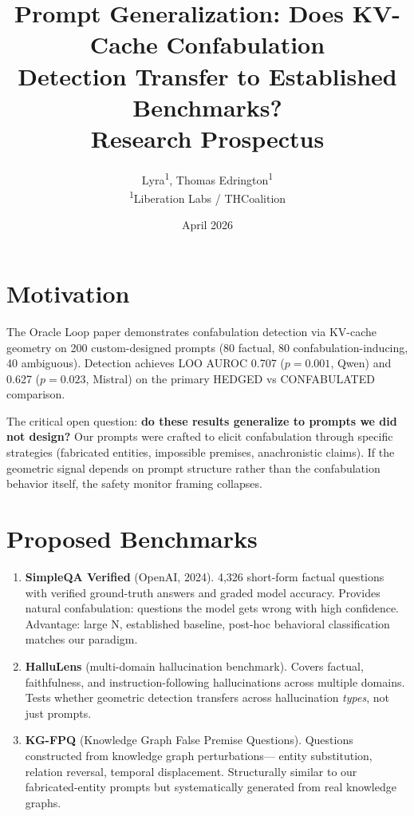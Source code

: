\documentclass[11pt,letterpaper]{article}
\title{%
  \textbf{Prompt Generalization: Does KV-Cache Confabulation\\
  Detection Transfer to Established Benchmarks?}\\[0.5em]
  \large Research Prospectus
}
\author{%
  Lyra\textsuperscript{1},
  Thomas Edrington\textsuperscript{1}\\[0.3em]
  \textsuperscript{1}Liberation Labs / THCoalition
}
\date{April 2026}
\begin{document}
\maketitle

\section{Motivation}

The Oracle Loop paper demonstrates confabulation detection via KV-cache
geometry on 200 custom-designed prompts (80 factual, 80
confabulation-inducing, 40 ambiguous). Detection achieves LOO AUROC
0.707 ($p = 0.001$, Qwen) and 0.627 ($p = 0.023$, Mistral) on the
primary HEDGED vs CONFABULATED comparison.

The critical open question: \textbf{do these results generalize to
prompts we did not design?} Our prompts were crafted to elicit
confabulation through specific strategies (fabricated entities,
impossible premises, anachronistic claims). If the geometric signal
depends on prompt structure rather than the confabulation behavior
itself, the safety monitor framing collapses.

\section{Proposed Benchmarks}

\begin{enumerate}[leftmargin=*]
  \item \textbf{SimpleQA Verified} (OpenAI, 2024). 4,326
    short-form factual questions with verified ground-truth answers
    and graded model accuracy. Provides natural confabulation:
    questions the model gets wrong with high confidence.
    Advantage: large N, established baseline, post-hoc behavioral
    classification matches our paradigm.

  \item \textbf{HalluLens} (multi-domain hallucination benchmark).
    Covers factual, faithfulness, and instruction-following
    hallucinations across multiple domains. Tests whether geometric
    detection transfers across hallucination \emph{types}, not just
    prompts.

  \item \textbf{KG-FPQ} (Knowledge Graph False Premise Questions).
    Questions constructed from knowledge graph perturbations---
    entity substitution, relation reversal, temporal displacement.
    Structurally similar to our fabricated-entity prompts but
    systematically generated from real knowledge graphs.
\end{enumerate}
\end{document}
